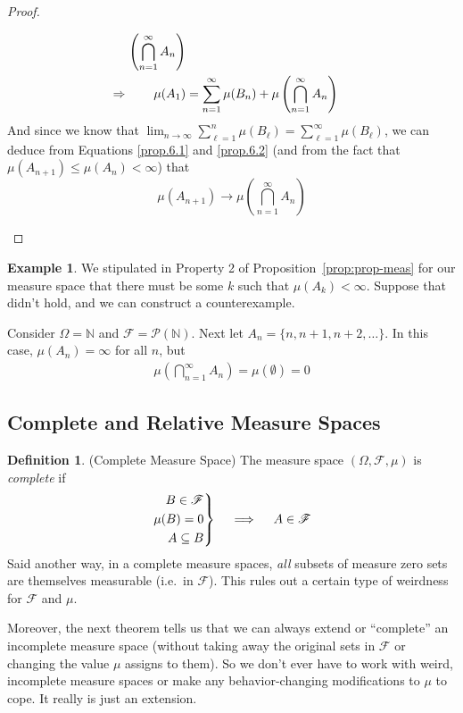 \documentclass[12pt]{article}
\theoremstyle{plain}
\theoremstyle{definition}
\newtheorem{defn}[thm]{Definition}
\newtheorem{ex}[thm]{Example}
\theoremstyle{remark}
\newcommand{\sF}{\mathscr{F}}
\newenvironment{rcases}
  {\left.\begin{aligned}}
  {\end{aligned}\right\rbrace}
\begin{document}
\begin{proof}
\begin{enumerate}
\begin{align}
            \left(\bigcap^\infty_{n=1} A_n\right) \notag \\
        \Rightarrow \qquad
            \mu(A_1) &=
            \sum^\infty_{n=1} \mu(B_n) +
            \mu\left(\bigcap^\infty_{n=1} A_n\right)
            \label{prop.6.2}
    \end{align}
    And since we know that $\lim_{n\rightarrow \infty} \sum^n_{\ell=1}
    \mu(B_\ell) = \sum^\infty_{\ell=1} \mu(B_\ell)$, we can deduce from
    Equations \ref{prop.6.1} and \ref{prop.6.2} (and from the fact that
    $\mu(A_{n+1}) \leq \mu(A_n) <\infty$) that
    \[ \mu(A_{n+1})\rightarrow
        \mu\left(\bigcap^\infty_{n=1} A_n\right)
    \]
\end{enumerate}
\end{proof}

\begin{ex}
We stipulated in Property 2 of Proposition~\ref{prop:prop-meas} for our
measure space that there must be some $k$ such that $\mu(A_k)<\infty$.
Suppose that didn't hold, and we can construct a counterexample.

Consider $\Omega = \mathbb{N}$ and $\sF =\mathscr{P}(\mathbb{N})$.
Next let $A_n = \{n, n+1, n+2, \ldots\}$. In this case, $\mu(A_n) =
\infty$ for all $n$, but
\begin{align*}
  \mu\left(\bigcap^\infty_{n=1} A_n\right) =
  \mu(\emptyset) = 0
\end{align*}
\end{ex}

\clearpage
\subsection{Complete and Relative Measure Spaces}

\begin{defn}(Complete Measure Space)
The measure space $(\Omega,\sF,\mu)$ is \emph{complete} if
\begin{align*}
  \begin{rcases}
      B\in\mathscr{F} \\
      \mu(B) = 0\\
      A\subseteq B
  \end{rcases}
  \quad \implies\quad
  A\in\mathscr{F}
\end{align*}
Said another way, in a complete measure spaces, \emph{all} subsets of
measure zero sets are themselves measurable (i.e.\ in $\sF$). This rules
out a certain type of weirdness for $\sF$ and $\mu$.

Moreover, the next theorem tells us that we can always extend or
``complete'' an incomplete measure space (without taking away the
original sets in $\sF$ or changing the value $\mu$ assigns to them). So
we don't ever have to work with weird, incomplete measure spaces or make
any behavior-changing modifications to $\mu$ to cope. It really is just
an extension.
\end{defn}
\end{document}

